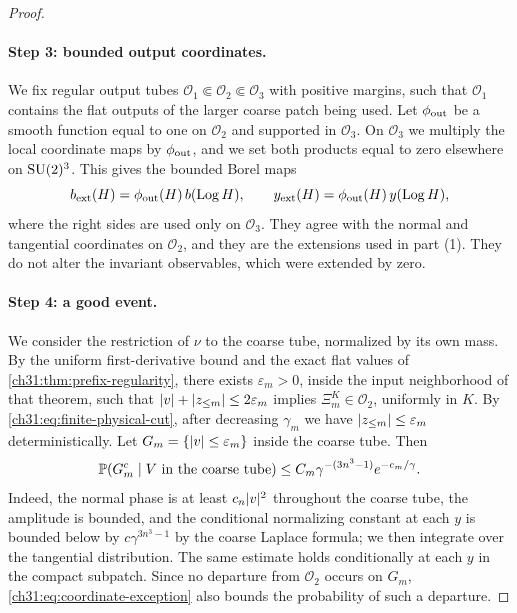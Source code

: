 \begin{proof}
\paragraph{Step 3: bounded output coordinates.}
We fix regular output tubes $\mathcal O_1\Subset\mathcal O_2\Subset\mathcal O_3$ with positive margins, such that $\mathcal O_1$ contains the flat outputs of the larger coarse patch being used. Let $\phi_{\rm out}$ be a smooth function equal to one on $\mathcal O_2$ and supported in $\mathcal O_3$. On $\mathcal O_3$ we multiply the local coordinate maps by $\phi_{\rm out}$, and we set both products equal to zero elsewhere on $\mathrm{SU}(2)^3$. This gives the bounded Borel maps
\begin{equation}\label{ch31:eq:bounded-output-coordinates}
 b_{\rm ext}(H)=\phi_{\rm out}(H)\,b(\operatorname{Log} H),\qquad y_{\rm ext}(H)=\phi_{\rm out}(H)\,y(\operatorname{Log} H),
\end{equation}
where the right sides are used only on $\mathcal O_3$. They agree with the normal and tangential coordinates on $\mathcal O_2$, and they are the extensions used in part (1). They do not alter the invariant observables, which were extended by zero.

\paragraph{Step 4: a good event.}
We consider the restriction of $\nu$ to the coarse tube, normalized by its own mass. By the uniform first-derivative bound and the exact flat values of \cref{ch31:thm:prefix-regularity}, there exists $\varepsilon_m>0$, inside the input neighborhood of that theorem, such that $\lvert v\rvert+\lvert z_{\le m}\rvert\le2\varepsilon_m$ implies $\Xi_m^K\in\mathcal O_2$, uniformly in $K$. By \eqref{ch31:eq:finite-physical-cut}, after decreasing $\gamma_m$ we have $\lvert z_{\le m}\rvert\le\varepsilon_m$ deterministically. Let $G_m=\{\lvert v\rvert\le\varepsilon_m\}$ inside the coarse tube. Then
\begin{equation}\label{ch31:eq:coordinate-exception}
 \mathbb P(G_m^c\mid V\text{ in the coarse tube})\le C_m\gamma^{-(3n^3-1)}e^{-c_m/\gamma}.
\end{equation}
Indeed, the normal phase is at least $c_n\lvert v\rvert^2$ throughout the coarse tube, the amplitude is bounded, and the conditional normalizing constant at each $y$ is bounded below by $c\gamma^{3n^3-1}$ by the coarse Laplace formula; we then integrate over the tangential distribution. The same estimate holds conditionally at each $y$ in the compact subpatch. Since no departure from $\mathcal O_2$ occurs on $G_m$, \eqref{ch31:eq:coordinate-exception} also bounds the probability of such a departure.


\end{proof}
